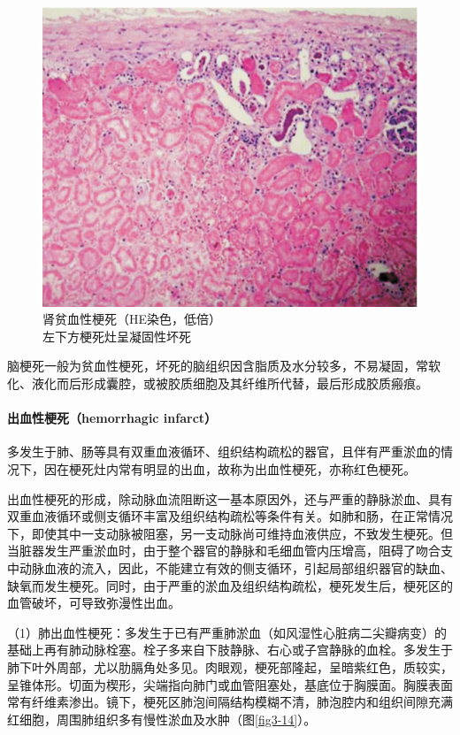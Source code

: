 \begin{figure}[!htbp]
  \centering
  \includegraphics{./images/Image00047.jpg}
  \caption{肾贫血性梗死（HE染色，低倍） \\ {\small 左下方梗死灶呈凝固性坏死}}
  \label{fig3-13}
\end{figure}

脑梗死一般为贫血性梗死，坏死的脑组织因含脂质及水分较多，不易凝固，常软化、液化而后形成囊腔，或被胶质细胞及其纤维所代替，最后形成胶质瘢痕。

\paragraph{出血性梗死（hemorrhagic infarct）}
多发生于肺、肠等具有双重血液循环、组织结构疏松的器官，且伴有严重淤血的情况下，因在梗死灶内常有明显的出血，故称为出血性梗死，亦称红色梗死。

出血性梗死的形成，除动脉血流阻断这一基本原因外，还与严重的静脉淤血、具有双重血液循环或侧支循环丰富及组织结构疏松等条件有关。如肺和肠，在正常情况下，即使其中一支动脉被阻塞，另一支动脉尚可维持血液供应，不致发生梗死。但当脏器发生严重淤血时，由于整个器官的静脉和毛细血管内压增高，阻碍了吻合支中动脉血液的流入，因此，不能建立有效的侧支循环，引起局部组织器官的缺血、缺氧而发生梗死。同时，由于严重的淤血及组织结构疏松，梗死发生后，梗死区的血管破坏，可导致弥漫性出血。

（1）肺出血性梗死：多发生于已有严重肺淤血（如风湿性心脏病二尖瓣病变）的基础上再有肺动脉栓塞。栓子多来自下肢静脉、右心或子宫静脉的血栓。多发生于肺下叶外周部，尤以肋膈角处多见。肉眼观，梗死部隆起，呈暗紫红色，质较实，呈锥体形。切面为楔形，尖端指向肺门或血管阻塞处，基底位于胸膜面。胸膜表面常有纤维素渗出。镜下，梗死区肺泡间隔结构模糊不清，肺泡腔内和组织间隙充满红细胞，周围肺组织多有慢性淤血及水肿（图\ref{fig3-14}）。

